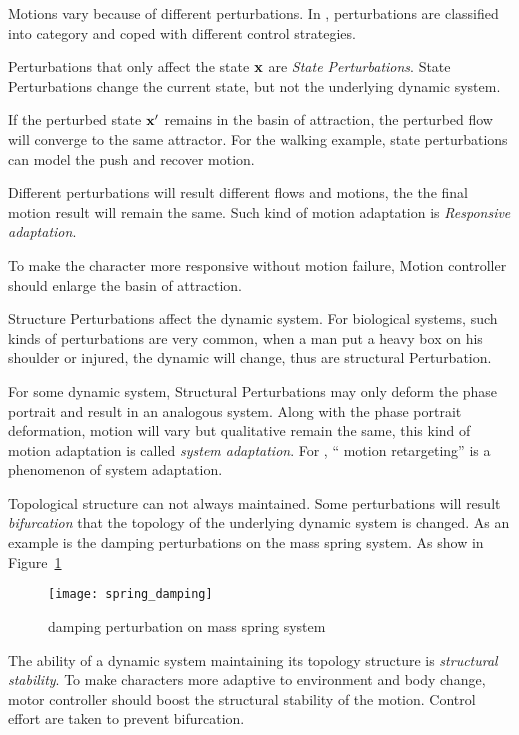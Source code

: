 Motions vary because of different perturbations.
In \moit, perturbations are classified into category and coped with different control strategies.

\begin{itemize}

Perturbations that only affect the state $\mathbf{x}$ are \emph{State Perturbations}.
State Perturbations change the current state, but not the underlying dynamic system.


If the perturbed state $\mathbf{x}'$ remains in the basin of attraction, the perturbed flow will converge to the same attractor. 
For the walking example, state perturbations can model the push and recover motion.

Different perturbations will result different flows and motions, the the final motion result will remain the same.
Such kind of motion adaptation is \emph{Responsive adaptation}.


To make the character more responsive without motion failure,
Motion controller should enlarge the basin of attraction.






Structure Perturbations affect the dynamic system.
For biological systems,  such kinds of perturbations are very common, when a man put a heavy box on his shoulder or injured, the dynamic will change, thus are structural Perturbation.


For some dynamic system,
Structural Perturbations may only deform the phase portrait and result in an analogous system.
Along with the phase portrait deformation, motion will vary but qualitative remain the same, this kind of motion adaptation is called \emph{system adaptation}.
For \cms, `` motion retargeting'' is a phenomenon of system adaptation.

Topological structure can not always maintained.
Some perturbations will result \emph{bifurcation} that the topology of the underlying dynamic system is changed.
As an  example is the damping perturbations on the mass spring system.
As show in Figure~\ref{fig:dampmass}

\begin{figure}
\begin{center}
\texttt{[image: spring\_damping]}
\end{center}
\caption{damping perturbation on mass spring system}
\label{fig:dampmass}
\end{figure}

The ability of a dynamic system maintaining its topology structure is \emph{structural stability}.
To make characters more adaptive to environment and body change, motor controller should boost the structural stability of the motion.
Control effort are taken to prevent bifurcation.
\end{itemize}


